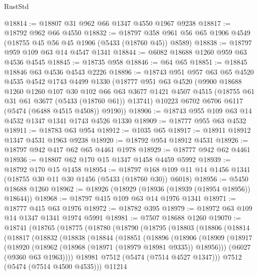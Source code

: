\begin{lexlean}{RustStd}
\begin{coremodule}
@18814 := @18807 @31 @962 @66 @1347 @4550 @1967 @9238
@18817 := @18792 @962 @66 @4550
@18832 := @18797 @358 @961 @56 @65 @1906 @4549 (@18755 @45 @56 @45 @1906 (@5433 (@18760 @45)) @8589)
@18838 := @18797 @959 @109 @63 @14 @4547 @1341
@18844 := @6082 @18688 @1260 @959 @63 @4536 @4545
@18845 := @18735 @958
@18846 := @64 @65
@18851 := @18845 @18846 @63 @4536 @4543 @2226
@18896 := @18743
    @951
    @957
    @63
    @65
    @4520
    @4535
    @4542
    @1743
    @4499
    @1330
    (@18777
      @951
      @63
      @4520
      (@9900
        @18688
        @1260
        @1260
        @107
        @30
        @102
        @66
        @63
        @3677
        @1421
        @4507
        @4515
        (@18755 @61 @31 @61 @3677 (@5433 (@18760 @61)) @13741)
        @10223
        @6702
        @6706
        @6117
        (@5474 (@6488 @4515 @4508))
        @9190))
@18906 := @18743 @955 @109 @63 @14 @4532 @1347 @1341 @1743 @4526 @1330
@18909 := @18777 @955 @63 @4532
@18911 := @18783 @63 @954
@18912 := @1035 @65
@18917 := @18911 @18912 @1347 @4531 @1963 @9238
@18920 := @18792 @954 @18912 @4531
@18926 := @18797 @942 @417 @62 @65 @4461 @1978
@18929 := @18777 @942 @62 @4461
@18936 := @18807 @62 @170 @15 @1347 @1458 @4459 @5992
@18939 := @18792 @170 @15 @1458
@18954 := @18797 @168 @109 @11 @14 @1456 @1341 (@18755 @30 @11 @30 @1456 (@5433 (@18760 @30)) @6018)
@18956 := @5450 @18688 @1260
@18962 := @18926 (@18929 (@18936 (@18939 (@18954 @18956)) @18644))
@18968 := @18797 @415 @109 @63 @14 @1976 @1341
@18971 := @18777 @415 @63 @1976
@18972 := @18782 @395
@18979 := @18972 @63 @109 @14 @1347 @1341 @1974 @5991
@18981 := @7507 @18688 @1260
@19070 := @18741
    (@18765
      (@18775
        (@18780
          (@18790
            (@18795
              (@18803
                (@18806
                  (@18814
                    (@18817
                      (@18832
                        (@18838
                          (@18844
                            (@18851
                              (@18896
                                (@18906
                                  (@18909
                                    (@18917
                                      (@18920
                                        (@18962 (@18968 (@18971 (@18979 @18981 @9335)) @18956)))
                                      (@6027 (@9360 @63 @1963))))
                                  @18981
                                  @7512
                                  (@5474 (@7514 @4527 @1347)))
                                @7512
                                (@5474 (@7514 @4500 @4535)))
                              @11214

\end{coremodule}
\end{lexlean}
